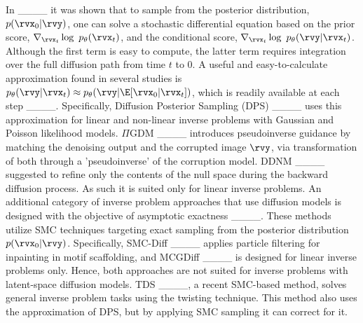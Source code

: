 In ____ it was shown that to sample from the posterior distribution, $p(\rvx_0 | \rvy)$, one can solve a stochastic differential equation based on the prior score, $\nabla_{\rvx_t} \log~p_{\theta}(\rvx_t)$, and the conditional score, $\nabla_{\rvx_t} \log~p_{\theta}(\rvy | \rvx_t)$. Although the first term is easy to compute, the latter term requires integration over the full diffusion path from time $t$ to $0$. A useful and easy-to-calculate approximation found in several studies is $p_{\theta}(\rvy | \rvx_t) \approx p_{\theta}(\rvy | \E[\rvx_0 | \rvx_t])$, which is readily available at each step ____.
Specifically, Diffusion Posterior Sampling (DPS) ____ uses this approximation for linear and non-linear inverse problems with Gaussian and Poisson likelihood models.
$\Pi$GDM ____ introduces pseudoinverse guidance by matching the denoising output and the corrupted image $\rvy$, via transformation of both through a 'pseudoinverse' of the corruption model. %
DDNM ____ suggested to refine only the contents of the null space during the backward diffusion process. As such it is suited only for linear inverse problems. 
An additional category of inverse problem approaches that use diffusion models is designed with the objective of asymptotic exactness ____. 
These methods utilize SMC techniques targeting exact sampling from the posterior distribution $p(\rvx_0 | \rvy)$. Specifically, 
SMC-Diff ____ applies particle filtering for inpainting in motif scaffolding, and
MCGDiff ____ is designed for linear inverse problems only. Hence, both approaches are not suited for inverse problems with latent-space diffusion models. %
TDS ____, a recent SMC-based method, solves general inverse problem tasks using the twisting technique. This method also uses the approximation of DPS, but by applying SMC sampling it can correct for it.



